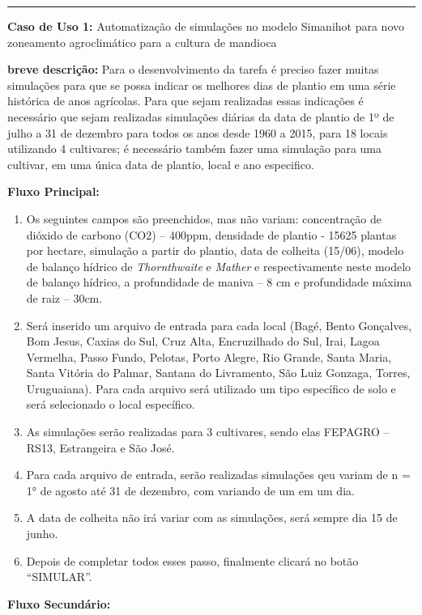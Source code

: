 \documentclass[tg]{mdtufsm}
\begin{document}

	\hrule \bigskip

	{\bf Caso de Uso 1:} Automatização de simulações no modelo Simanihot para novo zoneamento agroclimático para a cultura de mandioca
	\bigskip

	{\bf breve descrição:} Para o desenvolvimento da tarefa é preciso fazer muitas simulações para que se possa indicar os melhores dias de plantio em uma série histórica de anos agrícolas. Para que sejam realizadas essas indicações é necessário que sejam realizadas simulações diárias da data de plantio de 1º de julho a 31 de dezembro para todos os anos desde 1960 a 2015, para 18 locais utilizando 4 cultivares; é necessário também fazer uma simulação para uma cultivar, em uma única data de plantio, local e ano especifico.
	\bigskip

	{\bf Fluxo Principal:}

	\begin{enumerate}
		\item Os seguintes campos são preenchidos, mas não variam: concentração de dióxido de carbono (CO2) – 400ppm, densidade de plantio - 15625 plantas por hectare, simulação a partir do plantio, data de colheita (15/06), modelo de balanço hídrico de \emph{Thornthwaite} e \emph{Mather} e respectivamente neste modelo de balanço hídrico, a profundidade de maniva – 8 cm e profundidade máxima de raiz – 30cm.
		\item Será inserido um arquivo de entrada para cada local (Bagé, Bento Gonçalves, Bom Jesus, Caxias do Sul, Cruz Alta, Encruzilhado do Sul, Irai, Lagoa Vermelha, Passo Fundo, Pelotas, Porto Alegre, Rio Grande, Santa Maria, Santa Vitória do Palmar, Santana do Livramento, São Luiz Gonzaga, Torres, Uruguaiana). Para cada arquivo será utilizado um tipo específico de solo e será selecionado o local específico.
		\item As simulações serão realizadas para 3 cultivares, sendo elas FEPAGRO – RS13, Estrangeira e São José.
		\item Para cada arquivo de entrada, serão realizadas simulações qeu variam de n = 1° de agosto até 31 de dezembro, com variando de um em um dia.
		\item A data de colheita não irá variar com as simulações, será sempre dia 15 de junho.
		\item Depois de completar todos esses passo, finalmente clicará no botão “SIMULAR”.
	\end{enumerate}

	{\bf Fluxo Secundário:}
\end{document}
